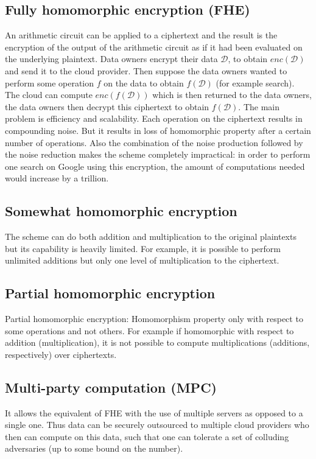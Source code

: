 \subsection{Fully homomorphic encryption (FHE)}
An arithmetic circuit can be applied to a ciphertext and the result is the encryption of the output of the arithmetic circuit as if it had been evaluated on the underlying plaintext. 
Data owners encrypt their data $\mathcal{D}$, to obtain $enc(\mathcal{\mathcal{D}})$ and send it to the cloud provider. Then suppose the data owners wanted to perform some operation $f$ on the data  to obtain $f(\mathcal{D})$ (for example search). The cloud can compute $enc(f(\mathcal{D}))$ which is then returned to the data owners, the data owners then decrypt this ciphertext to obtain $f(\mathcal{D})$. The main problem is efficiency and scalability.
Each operation on the ciphertext results in compounding noise.
But it results in loss of homomorphic property after a certain number of operations. Also the combination of the noise production followed by the noise reduction makes the scheme completely impractical: in order to perform one search on Google using this encryption, the amount of computations needed would increase by a trillion.

\subsection{Somewhat homomorphic encryption}
The scheme can do both addition and multiplication to the original plaintexts but its capability is heavily limited. For example, it is possible to perform unlimited additions but only one level of multiplication to the ciphertext.

\subsection{Partial homomorphic encryption}
Partial homomorphic encryption: Homomorphism property only with respect to some operations and not others. For example if homomorphic with respect to addition (multiplication), it is not possible to compute multiplications (additions, respectively) over ciphertexts.


\subsection{Multi-party computation (MPC)}
It allows the equivalent of FHE with the use of multiple servers as opposed to a single one. Thus data can be securely outsourced to multiple cloud providers who then can compute on this data, such that one can tolerate a set of colluding adversaries (up to some bound on the number).

